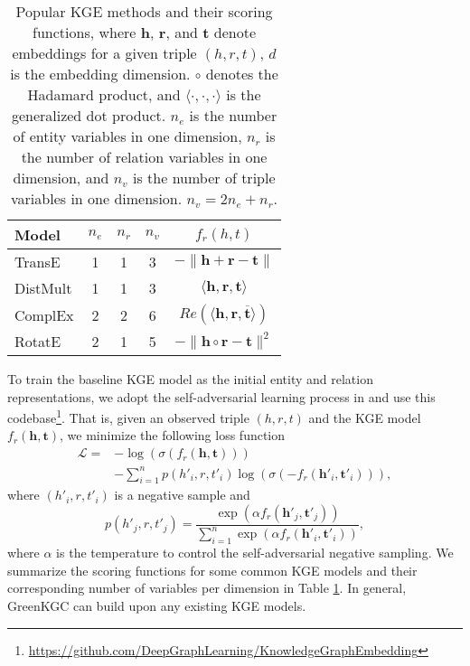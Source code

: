 \documentclass{article}
\begin{document}
\begin{table}[ht]
\setlength\tabcolsep{3pt}
\centering
\begin{tabular}{ l  c  c  c  c }
\toprule
Model & $n_e$ & $n_r$ & $n_v$ & $f_r(h, t)$\\
\midrule
TransE   & 1 & 1 & 3 & $-\| \bm{h} + \bm{r} - \bm{t} \|$ \\
DistMult & 1 & 1 & 3 & $\langle \bm{h}, \bm{r}, \bm{t} \rangle$ \\
ComplEx  & 2 & 2 & 6 & $Re(\langle \bm{h}, \bm{r}, \overline{\bm{t}} \rangle)$ \\
RotatE   & 2 & 1 & 5 & $-\| \bm{h} \circ \bm{r} - \bm{t} \|^2$ \\
\bottomrule
\end{tabular}
\caption{Popular KGE methods and their scoring functions, where $\bm{h}$, $\bm{r}$, 
and $\bm{t}$ denote embeddings for a given triple $(h, r, t)$, $d$ is the
embedding dimension. $ \circ $ denotes the Hadamard product, and
$\langle \cdot, \cdot, \cdot \rangle$ is the generalized dot product. $n_e$ 
is the number of entity variables in one dimension, $n_r$ 
is the number of relation variables in one dimension, and $n_v$ 
is the number of triple variables in one dimension. $n_v = 2 n_e + n_r$.}
\label{tab:models}
\end{table}


To train the baseline KGE model as the initial entity and relation
representations, we adopt the self-adversarial learning process in
\citet{sun2018rotate} and use this 
codebase\footnote{\url{https://github.com/DeepGraphLearning/KnowledgeGraphEmbedding}}. 
That is, given an observed triple $(h, r, t)$ and
the KGE model $f_r(\bm{h}, \bm{t})$, we minimize the following loss function
\begin{equation}
\begin{split}
        \mathcal{L} = {} & - \log(\sigma(f_r(\bm{h}, \bm{t}))) \\
                         & - \sum_{i=1}^n p(h'_i, r, t'_i) 
                    \log(\sigma( - f_r(\bm{h}'_i, \bm{t}'_i))), 
\end{split}
\end{equation}
where $(h'_i, r, t'_i)$ is a negative sample and 
\begin{equation}
        p(h'_j, r, t'_j) = \frac{\exp ( \alpha f_r(\bm{h}'_j, \bm{t}'_j) )}
{\sum_{i=1}^n \exp ( \alpha f_r(\bm{h}'_i, \bm{t}'_i) )},
\end{equation}
where $\alpha$ is the temperature to control the self-adversarial 
negative sampling. We summarize the scoring functions for 
some common KGE models and their corresponding number of variables per
dimension in Table \ref{tab:models}. In general, 
GreenKGC can build upon any existing KGE models.
\end{document}
